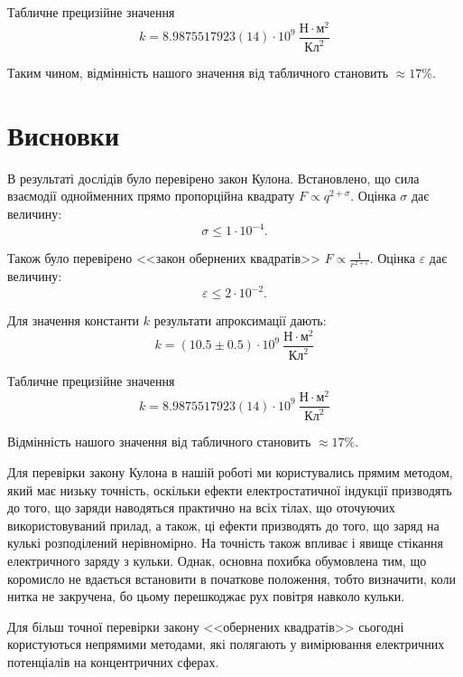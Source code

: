 \documentclass{LabWork}
\begin{document}
Табличне прецизійне значення
\begin{equation}\label{}
    k = 8.9875517923(14) \cdot 10^{9}\ \frac{\text{Н}\cdot\text{м}^2}{\text{Кл}^2}
\end{equation}

Таким чином, відмінність нашого значення від табличного становить $\approx 17\%$.

\section*{Висновки}

В результаті дослідів було перевірено закон Кулона. Встановлено, що сила взаємодії однойменних прямо пропорційна квадрату $F \propto q^{2 + \sigma}$. Оцінка $\sigma $ дає величину: 
\[
    \sigma \le 1\cdot10^{-4}.
\]

Також було перевірено <<закон обернених квадратів>> $F \propto \frac{1}{r^{2 + \varepsilon}}$. Оцінка $ \varepsilon $ дає величину: 
\[
    \varepsilon \le 2\cdot10^{-2}.
\]

Для значення константи $k$ результати апроксимації дають:
\begin{equation*}\label{}
    k = (10.5 \pm 0.5)\cdot 10^{9}\ \frac{\text{Н}\cdot\text{м}^2}{\text{Кл}^2}
\end{equation*}

Табличне прецизійне значення
\begin{equation*}\label{}
    k = 8.9875517923(14) \cdot 10^{9}\ \frac{\text{Н}\cdot\text{м}^2}{\text{Кл}^2}
\end{equation*}

Відмінність нашого значення від табличного становить $\approx 17\%$.

Для перевірки закону Кулона в нашій роботі ми користувались прямим методом, який має низьку точність, оскільки ефекти електростатичної індукції призводять до того, що заряди наводяться практично на всіх тілах, що
оточуючих використовуваний прилад, а також, ці ефекти призводять до того, що заряд на кулькі розподілений нерівномірно. На точність також впливає і явище стікання електричного заряду з кульки. Однак, основна похибка обумовлена тим, що коромисло не вдається встановити в початкове положення, тобто визначити, коли нитка не закручена, бо цьому перешкоджає рух повітря навколо кульки.

Для більш точної перевірки закону <<обернених квадратів>> сьогодні користуються непрямими методами, які полягають у вимірювання електричних потенціалів на концентричних сферах.
\end{document}
